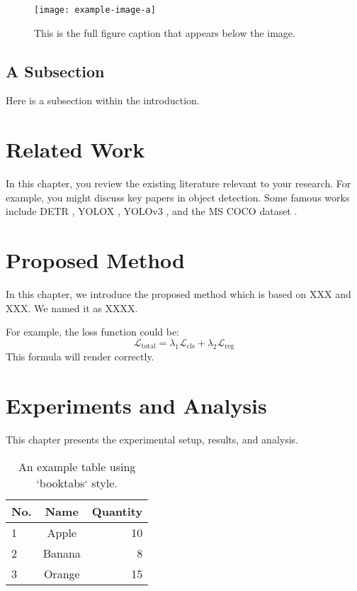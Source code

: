 \documentclass[12pt]{article}
\begin{document}
\begin{figure}[htbp]
    \centering %
    \texttt{[image: example-image-a]} %
    \caption[Short caption for LoF]{This is the full figure caption that appears below the image.}
    \label{fig:example}
\end{figure}

\subsection{A Subsection}
Here is a subsection within the introduction.

\section{Related Work}
\label{chap:relwork}

In this chapter, you review the existing literature relevant to your research. For example, you might discuss key papers in object detection.
Some famous works include DETR \cite{detr}, YOLOX \cite{yolox}, YOLOv3 \cite{yolov3}, and the MS COCO dataset \cite{coco2017}.

\section{Proposed Method}
\label{chap:methods}

In this chapter, we introduce the proposed method which is based on XXX and XXX. We named it as XXXX.

For example, the loss function could be:
$$ \mathcal{L}_{\text{total}} = \lambda_1 \mathcal{L}_{\text{cls}} + \lambda_2 \mathcal{L}_{\text{reg}} $$
This formula will render correctly.

\section{Experiments and Analysis}
\label{chap:exps}

This chapter presents the experimental setup, results, and analysis.

\begin{table}[htbp]
    \centering
    \caption{An example table using `booktabs` style.}
    \label{tab:fruit-quantity}
    \begin{tabular}{@{}lcr@{}}
        \toprule
        No. & Name   & Quantity \\
        \midrule
        1   & Apple  & 10       \\
        2   & Banana & 8        \\
        3   & Orange & 15       \\
        \bottomrule
    \end{tabular}
\end{table}
\end{document}
